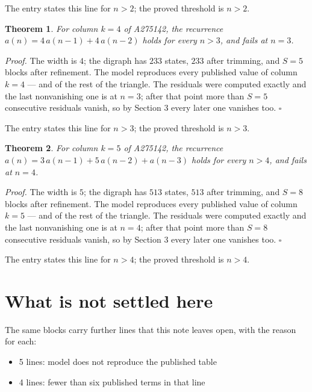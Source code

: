 \documentclass[11pt]{article}
\newtheorem{theorem}{Theorem}
\theoremstyle{definition}
\begin{document}
The entry states this line for $n > 2$; the proved threshold is $n > 2$.

\begin{theorem} For column $k = 4$ of A275142, the recurrence $a(n) = 4\,a(n-1) + 4\,a(n-2)$ holds for every $n > 3$, and fails at $n = 3$.\end{theorem}

{\itshape Proof.} The width is $4$; the digraph has $233$ states, $233$ after trimming, and $S = 5$ blocks after refinement. The model reproduces every published value of column $k = 4$ --- and of the rest of the triangle. The residuals were computed exactly and the last nonvanishing one is at $n = 3$; after that point more than $S = 5$ consecutive residuals vanish, so by Section 3 every later one vanishes too. $\square$

The entry states this line for $n > 3$; the proved threshold is $n > 3$.

\begin{theorem} For column $k = 5$ of A275142, the recurrence $a(n) = 3\,a(n-1) + 5\,a(n-2) + a(n-3)$ holds for every $n > 4$, and fails at $n = 4$.\end{theorem}

{\itshape Proof.} The width is $5$; the digraph has $513$ states, $513$ after trimming, and $S = 8$ blocks after refinement. The model reproduces every published value of column $k = 5$ --- and of the rest of the triangle. The residuals were computed exactly and the last nonvanishing one is at $n = 4$; after that point more than $S = 8$ consecutive residuals vanish, so by Section 3 every later one vanishes too. $\square$

The entry states this line for $n > 4$; the proved threshold is $n > 4$.

\section{What is not settled here}

The same blocks carry further lines that this note leaves open, with the reason for each:

\begin{itemize}

\item 5 lines: model does not reproduce the published table

\item 4 lines: fewer than six published terms in that line

\end{itemize}
\end{document}
